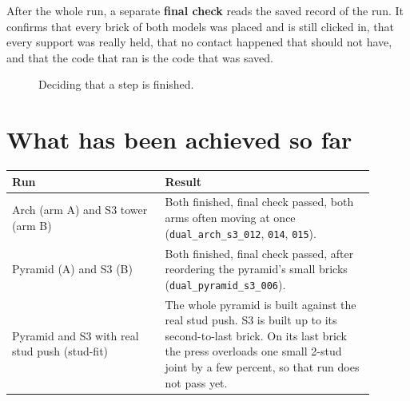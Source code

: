 \documentclass[11pt,a4paper]{article}
\begin{document}
After the whole run, a separate \textbf{final check} reads the saved record of
the run. It confirms that every brick of both models was placed and is still
clicked in, that every support was really held, that no contact happened that
should not have, and that the code that ran is the code that was saved.

\begin{figure}[H]
\centering
{}
\caption{Deciding that a step is finished.}
\end{figure}

\section{What has been achieved so far}

\begin{center}
\begin{tabular}{p{0.38\linewidth}p{0.52\linewidth}}
\toprule
Run & Result \\
\midrule
Arch (arm A) and S3 tower (arm B) & Both finished, final check passed, both arms often moving at once (\texttt{dual\_arch\_s3\_012}, \texttt{014}, \texttt{015}). \\
Pyramid (A) and S3 (B) & Both finished, final check passed, after reordering the pyramid's small bricks (\texttt{dual\_pyramid\_s3\_006}). \\
Pyramid and S3 with real stud push (stud-fit) & The whole pyramid is built against the real stud push. S3 is built up to its second-to-last brick. On its last brick the press overloads one small 2-stud joint by a few percent, so that run does not pass yet. \\
\bottomrule
\end{tabular}
\end{center}
\end{document}
